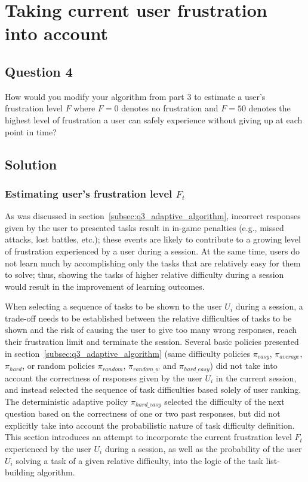 \chapter{Taking current user frustration into account} \label{ch:q4_user_frustration}

\section{Question 4} \label{sec:q4}
How would you modify your algorithm from part 3 to estimate a user's frustration level $F$ where $F = 0$ denotes no frustration and $F = 50$ denotes the highest level of frustration a user can safely experience without giving up at each point in time?

\section{Solution} \label{sec:q4_solution}

\subsection{Estimating user's frustration level $F_t$} \label{subsec:q4_frustration}

As was discussed in section~\ref{subsec:q3_adaptive_algorithm}, incorrect responses given by the user to presented tasks result in in-game penalties (e.g., missed attacks, lost battles, etc.);
these events are likely to contribute to a growing level of frustration experienced by a user during a session.
At the same time, users do not learn much by accomplishing only the tasks that are relatively easy for them to solve;
thus, showing the tasks of higher relative difficulty during a session would result in the improvement of learning outcomes.

When selecting a sequence of tasks to be shown to the user $U_i$ during a session, a trade-off needs to be established between the relative difficulties of tasks to be shown and the risk of causing the user to give too many wrong responses, reach their frustration limit and terminate the session.
Several basic policies presented in section~\ref{subsec:q3_adaptive_algorithm} (same difficulty policies $\pi_{easy}$, $\pi_{average}$, $\pi_{hard}$, or random policies $\pi_{random}$, $\pi_{random\_w}$ and $\pi_{hard\_easy}$) did not take into account the correctness of responses given by the user $U_i$ in the current session, and instead selected the sequence of task difficulties based solely of user ranking.
The deterministic adaptive policy $\pi_{hard\_easy}$ selected the difficulty of the next question based on the correctness of one or two past responses, but did not explicitly take into account the probabilistic nature of task difficulty definition.
This section introduces an attempt to incorporate the current frustration level $F_t$ experienced by the user $U_i$ during a session, as well as the probability of the user $U_i$ solving a task of a given relative difficulty, into the logic of the task list-building algorithm.


